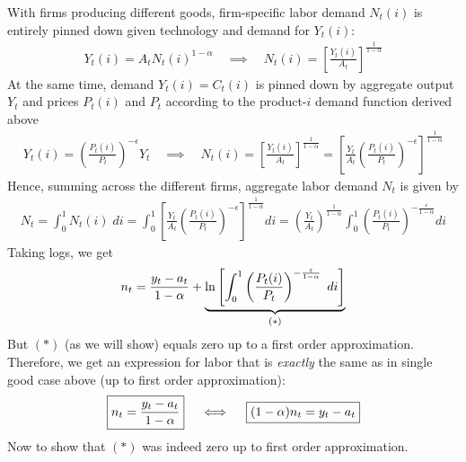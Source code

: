 \documentclass[12pt]{article}
\theoremstyle{plain}
\theoremstyle{definition}
\theoremstyle{remark}
\begin{document}
With firms producing different goods, firm-specific labor demand
$N_t(i)$ is entirely pinned down given technology and demand for
$Y_t(i)$:
\begin{align*}
    Y_t(i)=A_tN_t(i)^{1-\alpha}
    \quad\implies\quad
    N_t(i)=\left[\frac{Y_t(i)}{A_t}\right]^{\frac{1}{1-\alpha}}
\end{align*}
At the same time, demand $Y_t(i)=C_t(i)$ is pinned down by
aggregate output $Y_t$ and prices $P_t(i)$ and $P_t$ according
to the product-$i$ demand function derived above
\begin{align*}
  Y_t(i)
  =
  \left( \frac{P_t(i)}{P_t} \right)^{-\epsilon}
  Y_t
  \quad\implies\quad
  N_t(i)
  =\left[
    \frac{Y_t(i)}{A_t}
  \right]^{\frac{1}{1-\alpha}}
  =\left[
    \frac{Y_t}{A_t}
    \left( \frac{P_t(i)}{P_t} \right)^{-\epsilon}
  \right]^{\frac{1}{1-\alpha}}
\end{align*}
Hence, summing across the different firms, aggregate labor
demand $N_t$ is given by
\begin{align*}
  N_t
  = \int_0^1 N_t(i)\; di
  = \int_0^1
      \left[
        \frac{Y_t}{A_t}
        \left( \frac{P_t(i)}{P_t} \right)^{-\epsilon}
      \right]^{\frac{1}{1-\alpha}}
    di
  =
  \left(\frac{Y_t}{A_t}\right)^{\frac{1}{1-\alpha}}
  \int_0^1
  \left( \frac{P_t(i)}{P_t} \right)^{-\frac{\varepsilon}{1-\alpha}}
  di
\end{align*}
Taking logs, we get
\begin{align*}
  n_t = \frac{y_t-a_t}{1-\alpha}
  +
  \underbrace{%
  \ln\left[
  \int_0^1
  \left( \frac{P_t(i)}{P_t} \right)^{-\frac{\varepsilon}{1-\alpha}}
  \; di
  \right]
  }_{(*)}
\end{align*}
But $(*)$ (as we will show) equals zero up to a first order
approximation. Therefore, we get an expression for labor that is
\emph{exactly} the same as in single good case above (up to
first order approximation):
\begin{align*}
  \boxed{%
  n_t = \frac{y_t-a_t}{1-\alpha}
  }
  \quad\iff\quad
  \boxed{%
  (1-\alpha) n_t = y_t-a_t
  }
\end{align*}
\clearpage
Now to show that $(*)$ was indeed zero up to first order
approximation.
\end{document}
